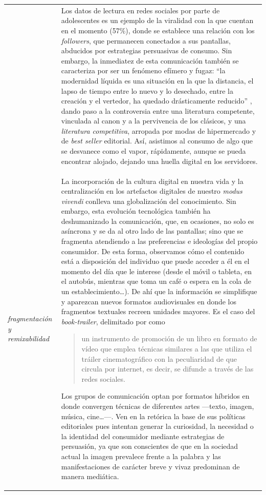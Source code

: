 \documentclass[spanish]{textolivre}
\begin{document}
\begin{small}
\begin{longtable}{
    >{\raggedright\arraybackslash}p{}
    p{}
    }
\\ & 
Los datos de lectura en redes sociales por parte de adolescentes es un ejemplo de la viralidad con la que cuentan en el momento (57\%), donde se establece una relación con los \emph{followers}, que permanecen conectados a sus pantallas, abducidos por estrategias persuasivas de consumo. Sin embargo, la inmediatez de esta comunicación también se caracteriza por ser un fenómeno efímero y fugaz: “la modernidad líquida es una situación en la que la distancia, el lapso de tiempo entre lo nuevo y lo desechado, entre la creación y el vertedor, ha quedado drásticamente reducido” \cite[p. 160]{scolari2021}, dando paso a la controversia entre una literatura competente, vinculada al canon y a la pervivencia de los clásicos, y una \emph{literatura competitiva}, arropada por modas de hipermercado y de \emph{best seller} editorial. Así, asistimos al consumo de algo que se desvanece como el vapor, rápidamente, aunque se pueda encontrar alojado, dejando una huella digital en los servidores. \\

\emph{fragmentación y remixabilidad} &
La incorporación de la cultura digital en nuestra vida y la centralización en los artefactos digitales de nuestro \emph{modus vivendi} conlleva una globalización del conocimiento. Sin embargo, esta evolución tecnológica también ha deshumanizado la comunicación, que, en ocasiones, no solo es asíncrona y se da al otro lado de las pantallas; sino que se fragmenta atendiendo a las preferencias e ideologías del propio consumidor. De esta forma, observamos cómo el contenido está a disposición del individuo que puede acceder a él en el momento del día que le interese (desde el móvil o tableta, en el autobús, mientras que toma un café o espera en la cola de un establecimiento…). De ahí que la información se simplifique y aparezcan nuevos formatos audiovisuales en donde los fragmentos textuales recreen unidades mayores. Es el caso del \emph{ book-trailer}, delimitado por \textcite[p.212]{tabernero_book_2013} como 
\begin{quote}
    un instrumento de promoción de un libro en formato de vídeo que emplea técnicas similares a las que utiliza el tráiler cinematográfico con la peculiaridad de que circula por internet, es decir, se difunde a través de las redes sociales.
\end{quote}
Los grupos de comunicación optan por formatos híbridos en donde convergen técnicas de diferentes artes —texto, imagen, música, cine…—. Ven en la retórica la base de sus políticas editoriales pues intentan generar la curiosidad, la necesidad o la identidad del consumidor mediante estrategias de persuasión, ya que son conscientes de que en la sociedad actual la imagen prevalece frente a la palabra y las manifestaciones de carácter breve y vivaz predominan de manera mediática. \\


\end{longtable}
\end{small}
\end{document}
